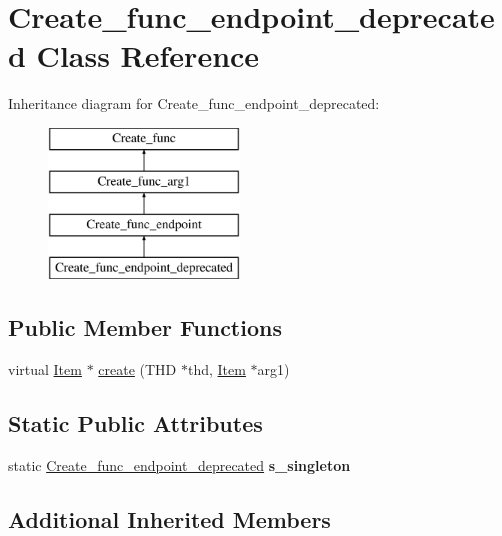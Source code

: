 \hypertarget{classCreate__func__endpoint__deprecated}{}\section{Create\+\_\+func\+\_\+endpoint\+\_\+deprecated Class Reference}
\label{classCreate__func__endpoint__deprecated}
Inheritance diagram for Create\+\_\+func\+\_\+endpoint\+\_\+deprecated\+:\begin{figure}[H]
\begin{center}
\leavevmode
\includegraphics[height=4.000000cm]{classCreate__func__endpoint__deprecated}
\end{center}
\end{figure}
\subsection*{Public Member Functions}
\begin{DoxyCompactItemize}
\item 
virtual \mbox{\hyperlink{classItem}{Item}} $\ast$ \mbox{\hyperlink{classCreate__func__endpoint__deprecated_ac7c2c610c432d090a6a2935fbc76a1da}{create}} (T\+HD $\ast$thd, \mbox{\hyperlink{classItem}{Item}} $\ast$arg1)
\end{DoxyCompactItemize}
\subsection*{Static Public Attributes}
\begin{DoxyCompactItemize}
\item 
\mbox{\label{classCreate__func__endpoint__deprecated_af3d285535ae7388d4daea802a1b32d62}} 
static \mbox{\hyperlink{classCreate__func__endpoint__deprecated}{Create\+\_\+func\+\_\+endpoint\+\_\+deprecated}} {\bfseries s\+\_\+singleton}
\end{DoxyCompactItemize}
\subsection*{Additional Inherited Members}


